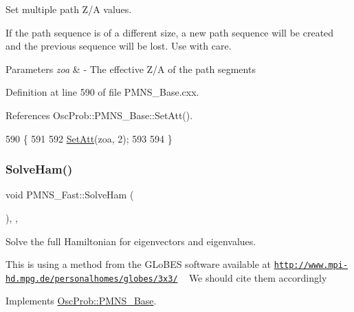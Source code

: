 Set multiple path Z/A values.

If the path sequence is of a different size, a new path sequence will be created and the previous sequence will be lost. Use with care.


\begin{DoxyParams}{Parameters}
{\em zoa} & -\/ The effective Z/A of the path segments \\
\hline
\end{DoxyParams}


Definition at line 590 of file P\+M\+N\+S\+\_\+\+Base.\+cxx.



References Osc\+Prob\+::\+P\+M\+N\+S\+\_\+\+Base\+::\+Set\+Att().


\begin{DoxyCode}
590                                            \{
591 
592   \hyperlink{classOscProb_1_1PMNS__Base_aba565962a440d14bee7a2a96d2eca2c5}{SetAtt}(zoa, 2);
593 
594 \}
\end{DoxyCode}
\mbox{\label{classOscProb_1_1PMNS__Fast_a8a0828401591e88c60e0051fbfe02d5e}} 
\subsubsection{\texorpdfstring{Solve\+Ham()}{SolveHam()}}
{\footnotesize\ttfamily void P\+M\+N\+S\+\_\+\+Fast\+::\+Solve\+Ham (\begin{DoxyParamCaption}{ }\end{DoxyParamCaption})\hspace{0.3cm}{\ttfamily [protected]}, {\ttfamily [virtual]}, {\ttfamily [inherited]}}

Solve the full Hamiltonian for eigenvectors and eigenvalues.

This is using a method from the G\+Lo\+B\+ES software available at \href{http://www.mpi-hd.mpg.de/personalhomes/globes/3x3/}{\tt http\+://www.\+mpi-\/hd.\+mpg.\+de/personalhomes/globes/3x3/} ~\newline
We should cite them accordingly 

Implements \hyperlink{classOscProb_1_1PMNS__Base_a91f065cb9e910e0095e41462b4420b01}{Osc\+Prob\+::\+P\+M\+N\+S\+\_\+\+Base}.



